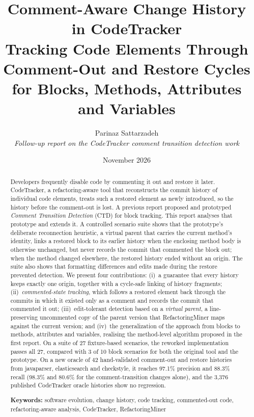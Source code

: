\documentclass[11pt,a4paper]{article}
\title{\textbf{Comment-Aware Change History in CodeTracker}\\[4pt]
\large Tracking Code Elements Through Comment-Out and Restore Cycles\\
for Blocks, Methods, Attributes and Variables}
\author{Parinaz Sattarzadeh\\[2pt]
\small\itshape Follow-up report on the CodeTracker comment transition detection work}
\date{November 2026}
\begin{document}
\maketitle

\begin{abstract}
Developers frequently disable code by commenting it out and restore it later. CodeTracker, a refactoring-aware tool that reconstructs the commit history of individual code elements, treats such a restored element as newly introduced, so the history before the comment-out is lost. A previous report proposed and prototyped \emph{Comment Transition Detection} (CTD) for block tracking. This report analyses that prototype and extends it. A controlled scenario suite shows that the prototype's deliberate reconnection heuristic, a virtual parent that carries the current method's identity, links a restored block to its earlier history when the enclosing method body is otherwise unchanged, but never records the commit that commented the block out; when the method changed elsewhere, the restored history ended without an origin. The suite also shows that formatting differences and edits made during the restore prevented detection. We present four contributions: (i)~a guarantee that every history keeps exactly one origin, together with a cycle-safe linking of history fragments; (ii)~\emph{commented-state tracking}, which follows a restored element back through the commits in which it existed only as a comment and records the commit that commented it out; (iii)~edit-tolerant detection based on a \emph{virtual parent}, a line-preserving uncommented copy of the parent version that RefactoringMiner maps against the current version; and (iv)~the generalization of the approach from blocks to methods, attributes and variables, realising the method-level algorithm proposed in the first report. On a suite of 27 fixture-based scenarios, the reworked implementation passes all 27, compared with 3 of 10 block scenarios for both the original tool and the prototype. On a new oracle of 42 hand-validated comment-out and restore histories from javaparser, elasticsearch and checkstyle, it reaches 97.1\% precision and 88.3\% recall (98.3\% and 80.6\% for the comment-transition changes alone), and the 3{,}376 published CodeTracker oracle histories show no regression.

\medskip
\noindent\textbf{Keywords:} software evolution, change history, code tracking, commented-out code, refactoring-aware analysis, CodeTracker, RefactoringMiner
\end{abstract}
\end{document}
